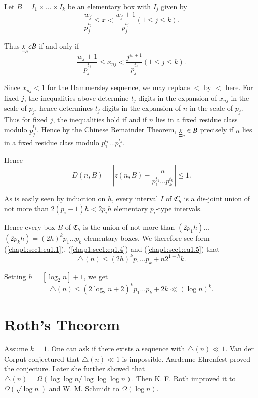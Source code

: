 Let $B = I_{1} \times \ldots \times I_{k}$ be an elementary box with $I_{j}$ given by 
$$
\frac{w_{j}}{p_{j}^{t_{j}}} \leq x < \frac{w_j +1}{p_{j}^{t_{j}}} (1 \leq j \leq k).
$$

Thus $\underline{\underline{x}}_{n} \epsilon B$ if and only if
$$
\frac{w_j+1}{p_{j}^{t_{j}}} \leq x_{nj} < \frac{j^{w+1}}{p_{j}^{t_{j}}} (1 \leq j \leq k).
$$

Since $x_{nj} < 1$ for the Hammersley sequence, we may replace $\dot{<}$ by $<$ here. For fixed $j$, the inequalities above determine $t_{j}$ digits in the expansion of $x_{nj}$ in the scale of $p_{j}$, hence determines $t_{j}$ digits in the expansion of $n$ in the scale of $p_{j}$. Thus for fixed $j$, the inequalities hold if and if $n$ lies in a fixed residue class modulo $p_{j}^{t_{j}}$. Hence by the Chinese Remainder Theorem, $\underline{\underline{x}}_{n} \in B$ precisely if $n$ lies in a fixed residue class modulo $p_{1}^{t_{1}} \ldots p_{k}^{t_{k}}$.

Hence\pageoriginale
\begin{equation*}
  D(n, B) = |z(n, B) - \frac{n}{p_{1}^{t_{1}} \ldots p_{k}^{t_{k}}}| \leq 1.\tag{1.5}\label{chap1:sec1:eq1.5}
\end{equation*}

As is easily seen by induction on $h$, every interval $I$ of $\mathfrak{C}_{h}^{i}$ is a dis-joint union of not more than $2(p_{i}-1)h < 2p_{i}h$ elementary $p_{i}$-type intervals.

Hence every box $B$ of $\mathfrak{C}_{h}$ is the union of not more than $(2p_{1}h) \ldots$ $(2p_{k}h) = (2h)^{k} p_{1} \ldots p_{k}$ elementary boxes. We therefore see form (\ref{chap1:sec1:eq1.1}), (\ref{chap1:sec1:eq1.4}) and (\ref{chap1:sec1:eq1.5}) that
$$
\triangle(n) \leq (2h)^{k} p_{1} \ldots p_{k} + n2^{1-h}k.
$$

Setting $h = [\log_{2} n] + 1$, we get
$$
\triangle(n) \leq (2 \log_{2} n + 2)^{k} p_{1} \ldots p_{k} + 2k \ll (\log n)^{k}.
$$

\section{Roth's Theorem}\label{chap1:sec2}

Assume $k = 1$. One can ask if there exists a sequence with $\triangle(n) \ll 1$. Van der Corput \cite{29} conjectured that $\triangle(n) \ll 1$ is impossible.
Aardenne-Ehrenfest \cite{1} proved the conjecture. Later \cite{2} she further showed that $\triangle(n) = \Omega (\log \log n/ \log \log \log n)$. Then K. F. Roth \cite{19} improved it to $\Omega (\sqrt{\log n})$ and W. M. Schmidt \cite{25} to $\Omega(\log n)$.

